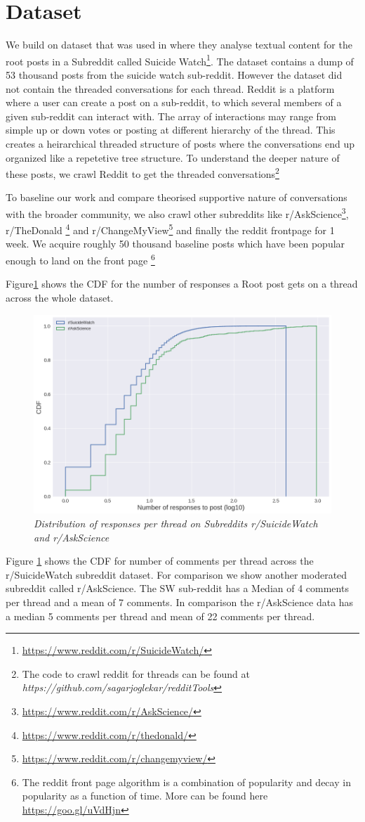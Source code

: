 \section{Dataset}
We build on dataset that was used in \cite{gkotsis2017characterisation} where they analyse textual content for the root posts in a Subreddit called Suicide Watch\footnote{\url{https://www.reddit.com/r/SuicideWatch/}}. The dataset contains a dump of 53 thousand posts from the suicide watch sub-reddit. 
However the dataset did not contain the threaded conversations for each thread. Reddit is a platform where a user can create a post on a sub-reddit, to which several members of a given sub-reddit can interact with. The array of interactions may range from simple up or down votes or posting at different hierarchy of the thread. This creates a heirarchical threaded structure of posts where the conversations end up organized like a repetetive tree structure. To understand the deeper nature of these posts,  we crawl Reddit to get the threaded conversations\footnote{The code to crawl reddit for threads can be found at \textit{https://github.com/sagarjoglekar/redditTools}} 

To baseline our work and compare theorised supportive nature of conversations with the broader community, we also crawl other subreddits like r/AskScience\footnote{\url{https://www.reddit.com/r/AskScience/}}, r/TheDonald \footnote{\url{https://www.reddit.com/r/thedonald/}} and r/ChangeMyView\footnote{\url{https://www.reddit.com/r/changemyview/}} and finally the reddit frontpage for 1 week. We acquire roughly 50 thousand baseline posts which have been popular enough to land on the front page \footnote{The reddit front page algorithm is a combination of popularity and decay in popularity as a function of time. More can be found here \url{https://goo.gl/uVdHjn}}

Figure\ref{fig:responseDist} shows the CDF for the number of responses a Root post gets on a thread across the whole dataset. 
\begin{figure}[!htb]
	\centering
	\includegraphics[width=0.5\columnwidth]{Figures/responseDistSW}
	\caption{\textsl{ Distribution of responses per thread on Subreddits r/SuicideWatch and r/AskScience }}
	\label{fig:responseDist}
\end{figure}

Figure \ref{fig:responseDist} shows the CDF for number of comments per thread across the r/SuicideWatch subreddit dataset. For comparison we show another moderated subreddit called r/AskScience. The SW sub-reddit has a Median of 4 comments per thread and a mean of 7 comments. In comparison the r/AskScience data has a median 5 comments per thread and mean of 22 comments per thread.